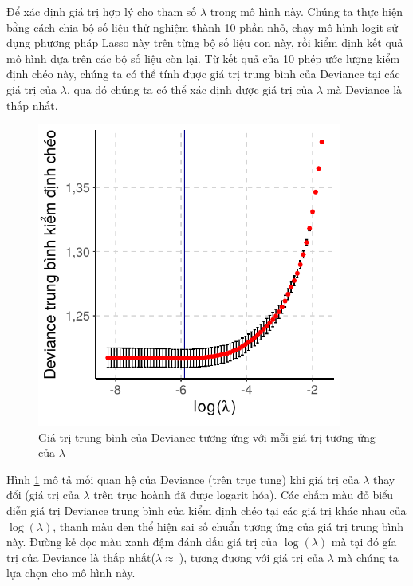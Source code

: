 \documentclass[a4paper]{report}\usepackage[]{graphicx}\usepackage[]{color}
\newenvironment{knitrout}{}{} %
\begin{document}
Để xác định giá trị hợp lý cho tham số $\lambda$ trong mô hình này. Chúng ta thực hiện bằng cách chia bộ số liệu thử nghiệm thành 10 phần nhỏ, chạy mô hình logit sử dụng phương pháp Lasso này trên từng bộ số liệu con này, rồi kiểm định kết quả mô hình dựa trên các bộ số liệu còn lại.
Từ kết quả của 10 phép ước lượng kiểm định chéo này, chúng ta có thể tính được giá trị trung bình của Deviance tại các giá trị của $\lambda$, qua đó chúng ta có thể xác định được giá trị của $\lambda$ mà Deviance là thấp nhất.

\begin{figure}
\centering
\capstart
\begin{knitrout}\small
{}\color{fgcolor}
\includegraphics[width=10cm,height=10cm]{Figures/lasso_cv-1} 

\end{knitrout}
\caption{Giá trị trung bình của Deviance tương ứng với mỗi giá trị tương ứng của $\lambda$}
\label{fig:lasso_cv}
\end{figure}

Hình \ref{fig:lasso_cv} mô tả mối quan hệ của Deviance (trên trục tung) khi giá trị của $\lambda$ thay đổi (giá trị của $\lambda$ trên trục hoành đã được logarit hóa). Các chấm màu đỏ biểu diễn giá trị Deviance trung bình của kiểm định chéo tại các giá trị khác nhau của $\log(\lambda)$, thanh màu đen thể hiện sai số chuẩn tương ứng của giá trị trung bình này. Đường kẻ dọc màu xanh đậm đánh dấu giá trị của $\log(\lambda)$ mà tại đó gía trị của Deviance là thấp nhất($\lambda \approx\ $), tương đương với giá trị của $\lambda$ mà chúng ta lựa chọn cho mô hình này.
\end{document}
